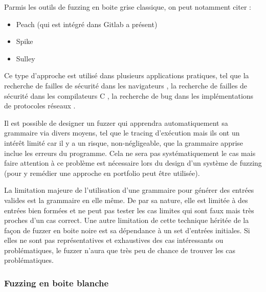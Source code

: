 \documentclass[a4paper]{report}
\begin{document}
Parmis les outils de fuzzing en boite grise classique, on peut notamment citer \cite{sutton2007fuzzing}:
\begin{itemize}
\item Peach (qui est intégré dans Gitlab a présent) \cite{peach}
\item Spike \cite{spike}
\item Sulley \cite{sulley}
\end{itemize}




Ce type d'approche est utilisé dans plusieurs applications pratiques, tel que la recherche de failles de sécurité dans les navigateurs \cite{holler2012fuzzing}, la recherche de failles de sécurité dans les compilateurs C \cite{yang2011finding}, la recherche de bug dans les implémentations de protocoles réseaux \cite{aflnet}.


Il est possible de designer un fuzzer qui apprendra automatiquement sa grammaire via divers moyens, tel que le tracing d'exécution \cite{hoschele2017mining} mais ils ont un intérêt limité car il y a un risque, non-négligeable, que la grammaire apprise inclue les erreurs du programme.
Cela ne sera pas systématiquement le cas mais faire attention à ce problème est nécessaire lors du design d'un système de fuzzing (pour y remédier une approche en portfolio peut être utilisée).

La limitation majeure de l'utilisation d'une grammaire pour générer des entrées valides est la grammaire en elle même.
De par sa nature, elle est limitée à des entrées bien formées et ne peut pas tester les cas limites qui sont faux mais très proches d'un cas correct.
Une autre limitation de cette technique héritée de la façon de fuzzer en boite noire est sa dépendance à un set d'entrées initiales.
Si elles ne sont pas représentatives et exhaustives des cas intéressants ou problématiques, le fuzzer n'aura que très peu de chance de trouver les cas problématiques.

\subsubsection{Fuzzing en boite blanche}
\end{document}
